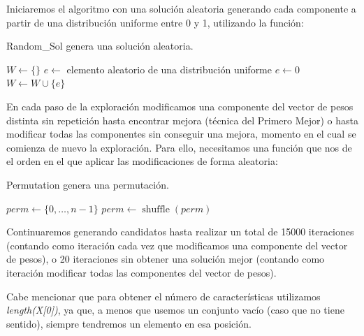 \documentclass[11pt,a4paper]{article}
\begin{document}
Iniciaremos el algoritmo con una solución aleatoria generando cada componente a partir de una distribución uniforme entre 0 y 1, utilizando la función: \\
\begin{algorithm}[H]
	\caption{{\sc Random\_Sol} genera una solución aleatoria.}
	
	$W \gets \{\}$ \;
	 {
		$e \gets$ elemento aleatorio de una distribución uniforme \;
		 {
			$e \gets 0$ \;
		}
		$W \gets W \cup \{e\}$ \;
	}
	 \;
\end{algorithm}

En cada paso de la exploración modificamos una componente del vector de pesos distinta sin repetición hasta encontrar mejora (técnica del Primero Mejor) o hasta modificar todas las componentes sin conseguir una mejora, momento en el cual se comienza de nuevo la exploración. Para ello, necesitamos una función que nos de el orden en el que aplicar las modificaciones de forma aleatoria: \\
\begin{algorithm}[H]
	\caption{{\sc Permutation} genera una permutación.}
	
	$perm \gets \{0, \dots, n-1\}$ \;
	$perm \gets \operatorname{shuffle}(perm)$ \;
	 \;
\end{algorithm}

Continuaremos generando candidatos hasta realizar un total de 15000 iteraciones (contando como iteración cada vez que modificamos una componente del vector de pesos), o 20 iteraciones sin obtener una solución mejor (contando como iteración modificar todas las componentes del vector de pesos).

Cabe mencionar que para obtener el número de características utilizamos \emph{length(X[0])}, ya que, a menos que usemos un conjunto vacío (caso que no tiene sentido), siempre tendremos un elemento en esa posición.
\end{document}
